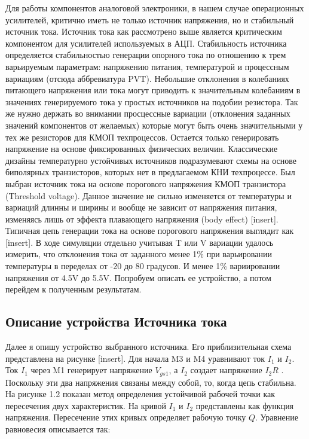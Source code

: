 \documentclass[a4paper,12pt]{article} %
\begin{document}
Для работы компонентов аналоговой электроники, в нашем случае операционных усилителей, критично иметь не только источник напряжения, но и стабильный источник тока. Источник тока как рассмотрено выше является критическим компонентом для усилителей используемых в АЦП. Стабильность источника определяется стабильностью генерации опорного тока по отношению к трем варьируемым параметрам: напряжению питания, температурой и процессным вариациям (отсюда аббревиатура PVT). Небольшие отклонения в колебаниях питающего напряжения или тока могут приводить к значительным колебаниям в значениях генерируемого тока у простых источников на подобии резистора.  Так же нужно держать во внимании просцессные вариации (отклонения заданных  значений компонентов от желаемых) которые могут быть очень значительными у тех же резисторов для КМОП техпроцессов. Остается только генерировать напряжение на основе фиксированных физических величин. Классические дизайны температурно устойчивых источников подразумевают схемы на основе биполярных транзисторов, которых нет в предлагаемом КНИ техпроцессе. Был выбран источник тока на основе порогового напряжения КМОП транзистора (Threshold voltage). Данное значение не сильно изменяется от температуры и вариаций длинны и ширины и вообще не зависит от напряжения питания, изменяясь лишь от эффекта плавающего напряжения (body effect) [insert]. Типичная цепь генерации тока на основе порогового напряжения выглядит как [insert]. В ходе симуляции отдельно учитывая T или V вариации удалось измерить, что отклонения тока от заданного менее 1\% при варьировании температуры в переделах от -20 до 80 градусов. И менее 1\% вариировании напряжения от 4.5V до 5.5V. Попробуем описать ее устройство, а потом перейдем к полученным результатам.

\subsection{Описание устройства Источника тока }


Далее я опишу устройство выбранного источника. Его приблизительная схема представлена на рисунке [insert].
Для начала M3 и M4 уравнивают ток $ I_1 $ и $ I_2 $. Ток $I_1$ через M1 генерирует напряжение $V_{gs1}$, а $I_2$ создает напряжение $I_2 R $ . Поскольку эти два напряжения связаны между собой, то, когда цепь стабильна. На рисунке 1.2 показан метод определения устойчивой рабочей  точки как пересечения двух характеристик. 
 На кривой $ I_1 $ и $ I_2 $ представлены как функция напряжения. Пересечение этих кривых определяет рабочую точку $Q$. Уравнение равновесия описывается так: 
\end{document}
